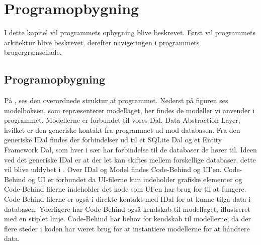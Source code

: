 \chapter{Programopbygning}

I dette kapitel vil programmets opbygning blive beskrevet. Først vil programmets arkitektur blive beskrevet, derefter navigeringen i programmets brugergrænseflade.


\section{Programopbygning}\label{sec:programopbygning}



På , ses den overordnede struktur af programmet.
Nederst på figuren ses modelboksen, som repræsenterer modellaget, her findes de modeller vi anvender i programmet.
Modellerne er forbundet til vores Dal, Data Abstraction Layer, hvilket er den generiske kontakt fra programmet ud mod databasen.
Fra den generiske IDal findes der forbindelser ud til et SQLite Dal og et Entity Framework Dal, som hver i sær har forbindelse til de databaser de hører til.
Ideen ved det generiske IDal er at der let kan skiftes mellem forskellige databaser, dette vil blive uddybet i .
Over IDal og Model findes Code-Behind og UI'en.
Code-Behind og UI er forbundet da UI-filerne kun indeholder grafiske elementer og Code-Behind filerne indeholder det kode som UI'en har brug for til at fungere.
Code-Behind filerne er også i direkte kontakt med IDal for at kunne tilgå data i databasen.
Yderligere har Code-Behind også kendskab til modellaget, illustreret med en stiplet linje.
Code-Behind har behov for kendskab til modellerne, da der flere steder i koden har været brug for at instantiere modellerne for at håndtere data. 

